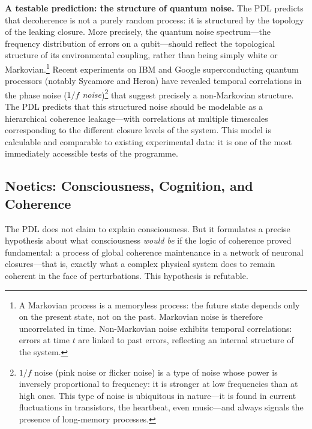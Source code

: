 \documentclass[12pt, a4paper, openright]{book}
\begin{document}
\textbf{A testable prediction: the structure of quantum noise.} The PDL predicts that decoherence is not a purely random process: it is structured by the topology of the leaking closure. More precisely, the quantum noise spectrum---the frequency distribution of errors on a qubit---should reflect the topological structure of its environmental coupling, rather than being simply white or Markovian.\footnote{A Markovian process is a memoryless process: the future state depends only on the present state, not on the past. Markovian noise is therefore uncorrelated in time. Non-Markovian noise exhibits temporal correlations: errors at time $t$ are linked to past errors, reflecting an internal structure of the system.} Recent experiments on IBM and Google superconducting quantum processors (notably Sycamore and Heron) have revealed temporal correlations in the phase noise (\textit{$1/f$ noise})\footnote{$1/f$ noise (pink noise or flicker noise) is a type of noise whose power is inversely proportional to frequency: it is stronger at low frequencies than at high ones. This type of noise is ubiquitous in nature---it is found in current fluctuations in transistors, the heartbeat, even music---and always signals the presence of long-memory processes.} that suggest precisely a non-Markovian structure. The PDL predicts that this structured noise should be modelable as a hierarchical coherence leakage---with correlations at multiple timescales corresponding to the different closure levels of the system. This model is calculable and comparable to existing experimental data: it is one of the most immediately accessible tests of the programme.

\subsection*{Noetics: Consciousness, Cognition, and Coherence}

The PDL does not claim to explain consciousness. But it formulates a precise hypothesis about what consciousness \emph{would be} if the logic of coherence proved fundamental: a process of global coherence maintenance in a network of neuronal closures---that is, exactly what a complex physical system does to remain coherent in the face of perturbations. This hypothesis is refutable.

\medskip
\end{document}
